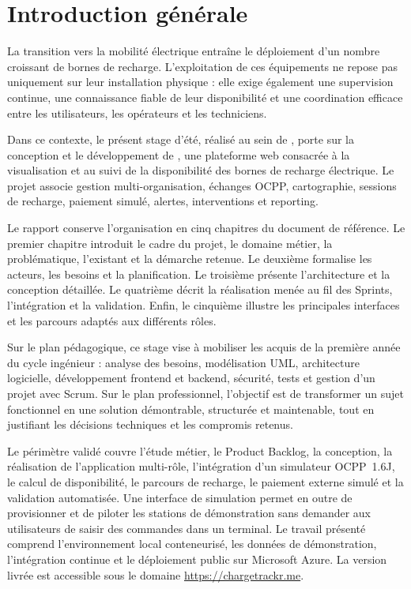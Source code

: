 \chapter*{Introduction générale}

La transition vers la mobilité électrique entraîne le déploiement d'un nombre croissant
de bornes de recharge. L'exploitation de ces équipements ne repose pas uniquement sur
leur installation physique : elle exige également une supervision continue, une
connaissance fiable de leur disponibilité et une coordination efficace entre les
utilisateurs, les opérateurs et les techniciens.

Dans ce contexte, le présent stage d'été, réalisé au sein de \CompanyName{}, porte sur
la conception et le développement de \ProjectName{}, une plateforme web consacrée à la
visualisation et au suivi de la disponibilité des bornes de recharge électrique. Le projet
associe gestion multi-organisation, échanges OCPP, cartographie, sessions de recharge,
paiement simulé, alertes, interventions et reporting.

Le rapport conserve l'organisation en cinq chapitres du document de référence. Le premier
chapitre introduit le cadre du projet, le domaine métier, la problématique, l'existant et
la démarche retenue. Le deuxième formalise les acteurs, les besoins et la planification.
Le troisième présente l'architecture et la conception détaillée. Le quatrième décrit la
réalisation menée au fil des Sprints, l'intégration et la validation. Enfin, le cinquième illustre les
principales interfaces et les parcours adaptés aux différents rôles.

Sur le plan pédagogique, ce stage vise à mobiliser les acquis de la première année du
cycle ingénieur : analyse des besoins, modélisation UML, architecture logicielle,
développement frontend et backend, sécurité, tests et gestion d'un projet avec Scrum.
Sur le plan professionnel, l'objectif est de transformer un sujet fonctionnel en une
solution démontrable, structurée et maintenable, tout en justifiant les décisions
techniques et les compromis retenus.

Le périmètre validé couvre l'étude métier, le Product Backlog, la conception, la
réalisation de l'application multi-rôle, l'intégration d'un simulateur OCPP~1.6J, le
calcul de disponibilité, le parcours de recharge, le paiement externe simulé et la
validation automatisée. Une interface de simulation permet en outre de provisionner
et de piloter les stations de démonstration sans demander aux utilisateurs de saisir
des commandes dans un terminal. Le travail présenté comprend l'environnement local
conteneurisé, les données de démonstration, l'intégration continue et le déploiement
public sur Microsoft Azure. La version livrée est accessible sous le domaine
\url{https://chargetrackr.me}.

